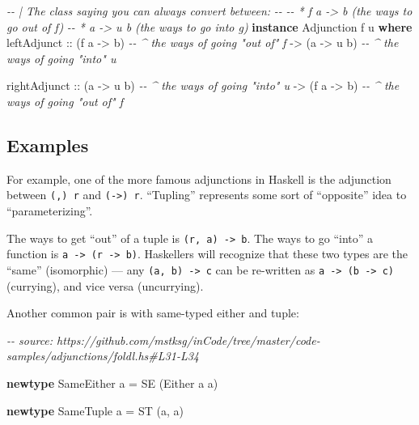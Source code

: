 \documentclass[]{article}
\newenvironment{Shaded}{}{}
\newcommand{\CommentTok}[1]{\textcolor[rgb]{0.38,0.63,0.69}{\textit{#1}}}
\newcommand{\DataTypeTok}[1]{\textcolor[rgb]{0.56,0.13,0.00}{#1}}
\newcommand{\KeywordTok}[1]{\textcolor[rgb]{0.00,0.44,0.13}{\textbf{#1}}}
\newcommand{\NormalTok}[1]{#1}
\newcommand{\OtherTok}[1]{\textcolor[rgb]{0.00,0.44,0.13}{#1}}
\begin{document}
\begin{Shaded}
\begin{Highlighting}[]
\CommentTok{{-}{-} | The class saying you can always convert between:}
\CommentTok{{-}{-}}
\CommentTok{{-}{-} * \textasciigrave{}f a {-}> b\textasciigrave{} (the ways to go out of \textasciigrave{}f\textasciigrave{})}
\CommentTok{{-}{-} * \textasciigrave{}a {-}> u b\textasciigrave{} (the ways to go into \textasciigrave{}g\textasciigrave{})}
\KeywordTok{instance} \DataTypeTok{Adjunction}\NormalTok{ f u }\KeywordTok{where}
\NormalTok{    leftAdjunct}
\OtherTok{        ::}\NormalTok{ (f a }\OtherTok{{-}>}\NormalTok{ b)       }\CommentTok{{-}{-} \^{} the ways of going "out of" \textasciigrave{}f\textasciigrave{}}
        \OtherTok{{-}>}\NormalTok{ (a }\OtherTok{{-}>}\NormalTok{ u b)       }\CommentTok{{-}{-} \^{} the ways of going "into" \textasciigrave{}u\textasciigrave{}}

\NormalTok{    rightAdjunct}
\OtherTok{        ::}\NormalTok{ (a }\OtherTok{{-}>}\NormalTok{ u b)       }\CommentTok{{-}{-} \^{} the ways of going "into" u}
        \OtherTok{{-}>}\NormalTok{ (f a }\OtherTok{{-}>}\NormalTok{ b)       }\CommentTok{{-}{-} \^{} the ways of going "out of" f}
\end{Highlighting}
\end{Shaded}

\hypertarget{examples}{%
\subsection{Examples}\label{examples}}

For example, one of the more famous adjunctions in Haskell is the adjunction
between \texttt{(,)\ r} and \texttt{(-\textgreater{})\ r}. ``Tupling''
represents some sort of ``opposite'' idea to ``parameterizing''.

The ways to get ``out'' of a tuple is \texttt{(r,\ a)\ -\textgreater{}\ b}. The
ways to go ``into'' a function is
\texttt{a\ -\textgreater{}\ (r\ -\textgreater{}\ b)}. Haskellers will recognize
that these two types are the ``same'' (isomorphic) --- any
\texttt{(a,\ b)\ -\textgreater{}\ c} can be re-written as
\texttt{a\ -\textgreater{}\ (b\ -\textgreater{}\ c)} (currying), and vice versa
(uncurrying).

Another common pair is with same-typed either and tuple:

\begin{Shaded}
\begin{Highlighting}[]
\CommentTok{{-}{-} source: https://github.com/mstksg/inCode/tree/master/code{-}samples/adjunctions/foldl.hs\#L31{-}L34}

\KeywordTok{newtype} \DataTypeTok{SameEither}\NormalTok{ a }\OtherTok{=} \DataTypeTok{SE}\NormalTok{ (}\DataTypeTok{Either}\NormalTok{ a a)}

\KeywordTok{newtype} \DataTypeTok{SameTuple}\NormalTok{  a }\OtherTok{=} \DataTypeTok{ST}\NormalTok{ (a, a)}
\end{Highlighting}
\end{Shaded}
\end{document}
